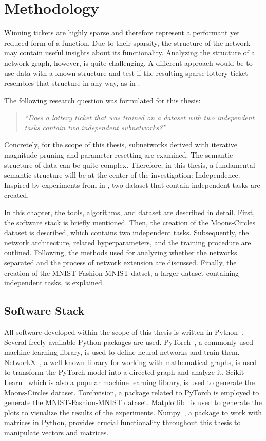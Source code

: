 \chapter{Methodology}
Winning tickets are highly sparse and therefore represent a performant yet reduced form of a function.
Due to their sparsity, the structure of the network may contain useful insights about its functionality.
Analyzing the structure of a network graph, however, is quite challenging.
A different approach would be to use data with a known structure and test if the resulting sparse lottery ticket resembles that structure in any way, as in \autocite{BIMT}.

The following research question was formulated for this thesis:

\begin{quote}
\textit{``Does a lottery ticket that was trained on a dataset with two independent tasks contain two independent subnetworks?''}
\end{quote}

Concretely, for the scope of this thesis, subnetworks derived with iterative magnitude pruning and parameter resetting are examined.
The semantic structure of data can be quite complex.
Therefore, in this thesis, a fundamental semantic structure will be at the center of the investigation: Independence.
Inspired by experiments from in \textcite{BIMT}, two dataset that contain independent tasks are created.

In this chapter, the tools, algorithms, and dataset are described in detail.
First, the software stack is briefly mentioned.
Then, the creation of the Moons-Circles dataset is described, which contains two independent tasks.
Subsequently, the network architecture, related hyperparameters, and the training procedure are outlined.
Following, the methods used for analyzing whether the networks separated and the process of network extension are discussed.
Finally, the creation of the MNIST-Fashion-MNIST datset, a larger dataset containing independent tasks, is explained.

\section{Software Stack}
All software developed within the scope of this thesis is written in Python~\autocite{python}.
Several freely available Python packages are used.
PyTorch~\autocite{pytorch}, a commonly used machine learning library, is used to define neural networks and train them.
NetworkX~\autocite{networkx}, a well-known library for working with mathematical graphs, is used to transform the PyTorch model into a directed graph and analyze it.
Scikit-Learn~\autocite{sklearn} which is also a popular machine learning library, is used to generate the Moons-Circles dataset.
Torchvision, a package related to PyTorch is employed to generate the MNIST-Fashion-MNIST dataset.
Matplotlib~\autocite{matplotlib} is used to generate the plots to visualize the results of the experiments.
Numpy~\autocite{numpy}, a package to work with matrices in Python, provides crucial functionality throughout this thesis to manipulate vectors and matrices.

